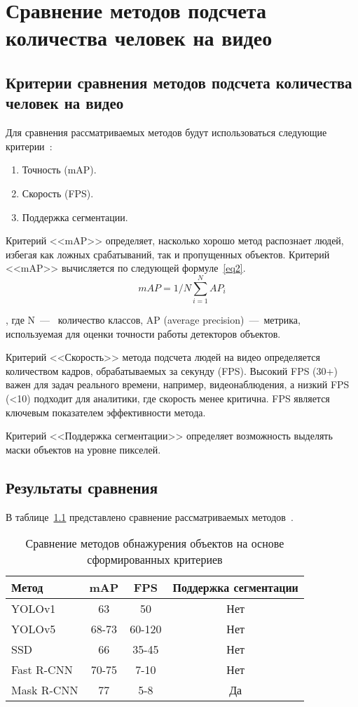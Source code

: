 \chapter{Сравнение методов подсчета количества человек на видео}

\section{Критерии сравнения методов подсчета количества человек на видео}

Для сравнения рассматриваемых методов будут использоваться следующие критерии~\cite{cmp}:
\begin{enumerate}[leftmargin=1.6\parindent]
	\item Точность (mAP).
	\item Скорость (FPS).
	\item Поддержка сегментации.
\end{enumerate}

Критерий <<mAP>> определяет, насколько хорошо метод распознает людей, избегая как ложных срабатываний, так и пропущенных объектов.
Критерий <<mAP>> вычисляется по следующей формуле~\ref{eq2}.
\begin{equation}
	\label{eq2}
	mAP = 1/N \sum_{i=1}^{N} AP_{i}
\end{equation}

, где N~---~ количество классов,
AP (average precision)~---~метрика, используемая для оценки точности работы детекторов объектов.

Критерий <<Скорость>> метода подсчета людей на видео определяется количеством кадров, обрабатываемых за секунду (FPS). Высокий FPS (30+) важен для задач реального времени, например, видеонаблюдения, а низкий FPS (<10) подходит для аналитики, где скорость менее критична. FPS является ключевым показателем эффективности метода.

Критерий <<Поддержка сегментации>> 
определяет возможность выделять маски объектов на уровне пикселей.
\section{Результаты сравнения}

В таблице~\ref{table1} представлено сравнение рассматриваемых методов~\cite{cmp}.
\clearpage
\begin{table}[!ht]
	\caption{\label{table1} Сравнение методов обнажурения объектов на основе сформированных критериев}
	\begin{tabularx}{\textwidth}{|X|c|c|c|}
		\hline
		Метод & mAP & FPS  & Поддержка сегментации \\ \hline
		YOLOv1 & 63 & 50 & Нет \\ \hline
		YOLOv5 & 68-73 & 60-120 & Нет \\ \hline
		SSD & 66 & 35-45 & Нет \\ \hline
		Fast R-CNN & 70-75 & 7-10 & Нет \\ \hline
		Mask R-CNN & 77 & 5-8 & Да \\ \hline
	\end{tabularx}
\end{table}

